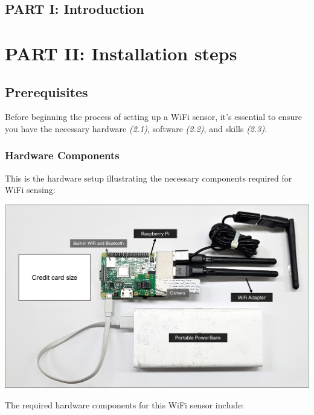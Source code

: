\documentclass[
  letterpaper,
]{scrbook}
\begin{document}

\chapter*{PART I: Introduction}\label{part-i-introduction}


\part{PART II: Installation steps}

\chapter{Prerequisites}\label{prerequisites}

Before beginning the process of setting up a WiFi sensor, it's essential
to ensure you have the necessary hardware \emph{(2.1)}, software
\emph{(2.2)}, and skills \emph{(2.3)}.

\section{Hardware Components}\label{hardware-components}

This is the hardware setup illustrating the necessary components
required for WiFi sensing:

\includegraphics{content/material/ch2/sensor_comp.png}

The required hardware components for this WiFi sensor include:
\end{document}

